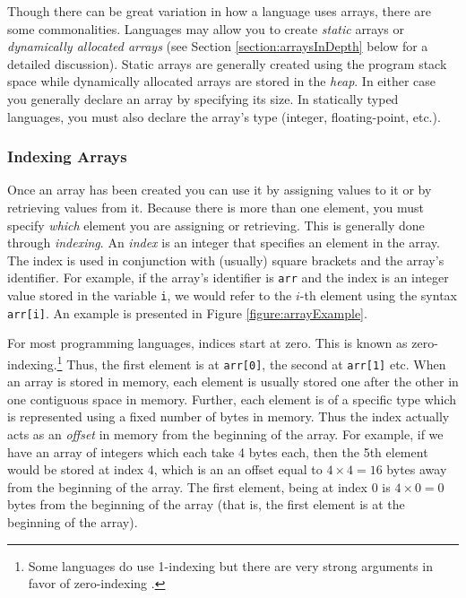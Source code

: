 Though there can be great variation in how a language uses arrays,
there are some commonalities.  Languages may allow you to create
 
\emph{static} arrays or \emph{dynamically allocated arrays} (see
Section \ref{section:arraysInDepth} below for a detailed discussion).  Static
arrays are generally created using the program stack space while 
dynamically allocated arrays are stored in the 
\emph{heap}.  In either
case you generally declare an array by specifying its size.  In statically
typed languages, you must also declare the array's type (integer, 
floating-point, etc.).

\subsubsection{Indexing Arrays}

Once an array has been created you can use it by assigning values
to it or by retrieving values from it.  Because there is more than one
element, you must specify \emph{which} element you are assigning
or retrieving.  This is generally done through \emph{indexing}.  An 
\emph{index} is an integer that specifies an element in the array.
The index is used in conjunction with (usually) square brackets and
the array's identifier.  For example, if the array's identifier is 
\texttt{arr} and the index is an integer value stored in the 
variable \texttt{i}, we would refer to the $i$-th element using
the syntax \texttt{arr[i]}.  An example is presented in Figure
\ref{figure:arrayExample}.



For most programming languages, indices start at zero.  This is 
known as zero-indexing.\footnote{Some languages do 
use 1-indexing but there are very strong arguments in favor of 
zero-indexing \cite{Dijkstra82}.} Thus, the first element is at 
\texttt{arr[0]}, the second at \texttt{arr[1]}
etc.  When an array is stored in memory, each element is usually 
stored one after the other in one contiguous space in memory.  
Further, each element is of a specific type which is represented
using a fixed number of bytes in memory.  Thus the index actually
acts as an \emph{offset} in memory from the beginning of the
array.  For example, if we have an array of integers which each take
4 bytes each, then the 5th element would be stored at index $4$, 
which is an an offset equal to $4 \times 4 = 16$ bytes away from the 
beginning of the array.  The first element, being at index $0$ is 
$4 \times 0 = 0$ bytes from the beginning of the array (that is, 
the first element is at the beginning of the array).

